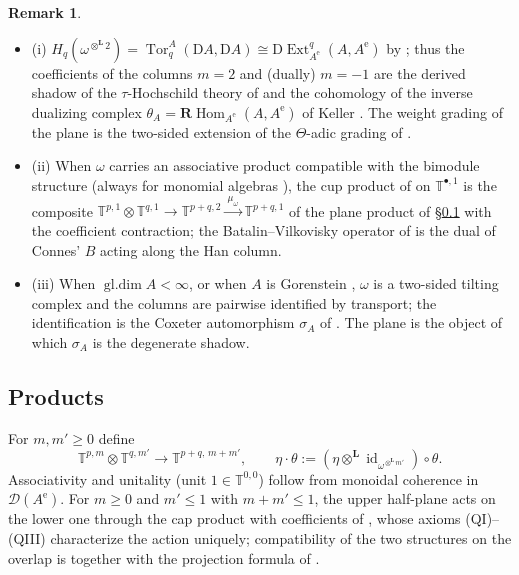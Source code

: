 \documentclass[11pt]{amsart}
\theoremstyle{definition}
\newtheorem{remark}[theorem]{Remark}
\newcommand{\T}{\mathbb{T}}
\newcommand{\D}{\mathrm{D}}
\newcommand{\Ext}{\operatorname{Ext}}
\newcommand{\Tor}{\operatorname{Tor}}
\newcommand{\rHom}{\mathbf{R}\!\operatorname{Hom}}
\newcommand{\gl}{\operatorname{gl.dim}}
\newcommand{\id}{\operatorname{id}}
\newcommand{\Ae}{A^{\mathrm{e}}}
\newcommand{\der}{\mathcal{D}}
\newcommand{\Lotimes}{\otimes^{\mathbf{L}}}
\begin{document}
\begin{remark}\label{rem:columns}

\begin{itemize}
    \item (i) $H_q(\omega^{\Lotimes2})=\Tor_q^A(\D A,\D A)\cong\D\Ext^q_{\Ae}(A,\Ae)$
by \cite[Theorem~3.2]{ArmTau}; thus the coefficients of the columns $m=2$ and
(dually) $m=-1$ are the derived shadow of the $\tau$-Hochschild theory of
\cite{CLMS-tau} and the cohomology of the inverse dualizing complex
$\theta_A=\rHom_{\Ae}(A,\Ae)$ of Keller \cite{KellerCY}. The weight grading of the
plane is the two-sided extension of the $\Theta$-adic grading of
\cite[\S8.4]{ArmCox}.
    \item (ii) When $\omega$ carries an associative product compatible with the
bimodule structure (always for monomial algebras \cite{ArmLeb}), the cup
product of \cite{ArmLeb} on $\T^{\bullet,1}$ is the composite
$\T^{p,1}\otimes\T^{q,1}\to\T^{p+q,2}\xrightarrow{\ \mu_\omega\ }\T^{p+q,1}$
of the plane product of \S\ref{subsec:products} with the coefficient
contraction; the Batalin--Vilkovisky operator of \cite{ArmLeb} is the dual of
Connes' $B$ acting along the Han column.
    \item (iii) When $\gl A<\infty$, or when $A$ is Gorenstein \cite{HappelGor},
$\omega$ is a two-sided tilting complex and the columns are pairwise
identified by transport; the identification is the Coxeter automorphism
$\sigma_A$ of \cite{ArmCox}. The plane is the object of which $\sigma_A$ is
the degenerate shadow.
\end{itemize}

\end{remark}

\subsection{Products}\label{subsec:products}
For $m,m'\ge0$ define
\[
\T^{p,m}\otimes\T^{q,m'}\longrightarrow\T^{p+q,\,m+m'},\qquad
\eta\cdot\theta:=(\eta\Lotimes\id_{\omega^{\Lotimes m'}})\circ\theta .
\]
Associativity and unitality (unit $1\in\T^{0,0}$) follow from monoidal
coherence in $\der(\Ae)$. For $m\ge0$ and $m'\le1$ with $m+m'\le1$, the upper
half-plane acts on the lower one through the cap product with coefficients of
\cite{ArmCap}, whose axioms (QI)--(QIII) characterize the action uniquely;
compatibility of the two structures on the overlap is \cite[Theorem
4.2]{ArmCap} together with the projection formula of
\cite[Theorem~4.2(1)]{ArmCox}.
\end{document}

